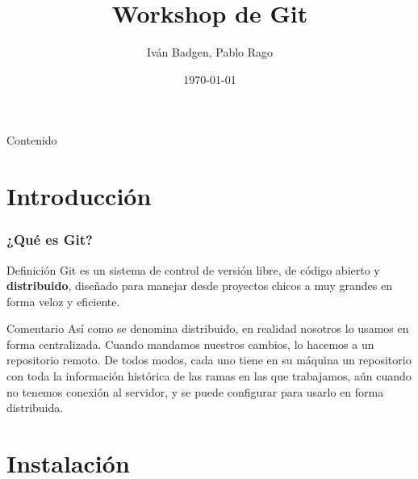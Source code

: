 \documentclass{beamer}
\begin{document}
\title{Workshop de Git}  
\author{Iván Badgen, Pablo Rago}
\date{\today} 

\begin{frame}
\titlepage
\end{frame}

\begin{frame}{Contenido}
\begin{multicols}{2}
\tableofcontents
\end{multicols}
\end{frame}

\section{Introducción} 

\begin{frame}\frametitle{¿Qué es Git?} 
  \begin{block}{Definición}
    Git es un sistema de control de versión libre, de código abierto y \textbf{distribuido}, diseñado
    para manejar desde proyectos chicos a muy grandes en forma veloz y eficiente. \footnotemark
  \end{block} \pause
  
  \begin{block}{Comentario}
    Así como se denomina distribuido, en realidad nosotros lo usamos en forma centralizada. Cuando mandamos nuestros cambios,
    lo hacemos a un repositorio remoto. De todos modos, cada uno tiene en su máquina un repositorio con toda la información
    histórica de las ramas en las que trabajamos, aún cuando no tenemos conexión al servidor, y se puede configurar para usarlo en forma
    distribuida. 
  \end{block}
\end{frame}

\section{Instalación}
\end{document}
